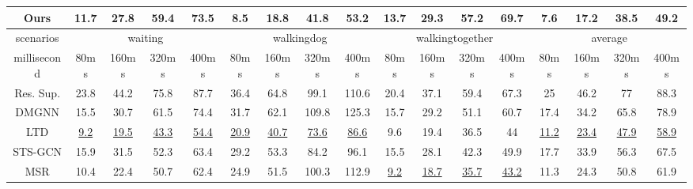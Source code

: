 \begin{table}[h]
{\begin{tabular}{c|cccc|cccc|cccc|cccc}
    Ours   & \textbf{11.7} & \textbf{27.8} & \textbf{59.4} & \textbf{73.5} & \textbf{8.5}  & \textbf{18.8} & \textbf{41.8} & \textbf{53.2} & \textbf{13.7} & \textbf{29.3} & \textbf{57.2} & \textbf{69.7} & \textbf{7.6} & \textbf{17.2} & \textbf{38.5} & \textbf{49.2} \\ \hline
    scenarios   & \multicolumn{4}{c}{waiting}                                   & \multicolumn{4}{c}{walkingdog}                                & \multicolumn{4}{c}{walkingtogether}                           & \multicolumn{4}{c}{average}                                      \\ \hline
    millisecond & 80ms          & 160ms         & 320ms         & 400ms         & 80ms          & 160ms         & 320ms         & 400ms         & 80ms          & 160ms         & 320ms         & 400ms         & 80ms         & 160ms         & 320ms         & 400ms         \\ \hline
    Res. Sup.   & 23.8          & 44.2          & 75.8          & 87.7          & 36.4          & 64.8          & 99.1          & 110.6         & 20.4          & 37.1          & 59.4          & 67.3          & 25           & 46.2          & 77            & 88.3          \\
    DMGNN & 15.5          & 30.7          & 61.5          & 74.4          & 31.7          & 62.1          & 109.8         & 125.3         & 15.7          & 29.2          & 51.1          & 60.7          & 17.4         & 34.2          & 65.8          & 78.9          \\
    LTD   & \underline{9.2}           & \underline{19.5}          & \underline{43.3}          & \underline{54.4}          & \underline{20.9}          & \underline{40.7}          &\underline{73.6}          & \underline{86.6}          & 9.6           & 19.4          & 36.5          & 44            & \underline{11.2}         & \underline{23.4}          & \underline{47.9}          & \underline{58.9}          \\
    STS-GCN              & 15.9                 & 31.5                 & 52.3                 & 63.4                          & 29.2                 & 53.3                 & 84.2                 & 96.1                 & 15.5                 & 28.1                 & 42.3                 & 49.9                 & 17.7                 & 33.9                 & 56.3                 & 67.5                 \\
    MSR   & 10.4          & 22.4          & 50.7          & 62.4          & 24.9          & 51.5          & 100.3         & 112.9         & \underline{9.2}           & \underline{18.7}          & \underline{35.7}          & \underline{43.2}          & 11.3         & 24.3          & 50.8          & 61.9          \\

\end{tabular}}
\end{table}
